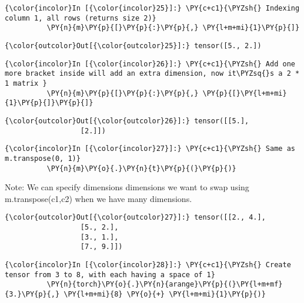 \begin{Verbatim}[commandchars=\\\{\}]
{\color{incolor}In [{\color{incolor}25}]:} \PY{c+c1}{\PYZsh{} Indexing column 1, all rows (returns size 2)}
          \PY{n}{m}\PY{p}{[}\PY{p}{:}\PY{p}{,} \PY{l+m+mi}{1}\PY{p}{]} 
\end{Verbatim}


\begin{Verbatim}[commandchars=\\\{\}]
{\color{outcolor}Out[{\color{outcolor}25}]:} tensor([5., 2.])
\end{Verbatim}
            
\begin{Verbatim}[commandchars=\\\{\}]
{\color{incolor}In [{\color{incolor}26}]:} \PY{c+c1}{\PYZsh{} Add one more bracket inside will add an extra dimension, now it\PYZsq{}s a 2 * 1 matrix }
          \PY{n}{m}\PY{p}{[}\PY{p}{:}\PY{p}{,} \PY{p}{[}\PY{l+m+mi}{1}\PY{p}{]}\PY{p}{]} 
\end{Verbatim}


\begin{Verbatim}[commandchars=\\\{\}]
{\color{outcolor}Out[{\color{outcolor}26}]:} tensor([[5.],
                  [2.]])
\end{Verbatim}

            
\begin{Verbatim}[commandchars=\\\{\}]
{\color{incolor}In [{\color{incolor}27}]:} \PY{c+c1}{\PYZsh{} Same as m.transpose(0, 1)}
          \PY{n}{m}\PY{o}{.}\PY{n}{t}\PY{p}{(}\PY{p}{)} 
\end{Verbatim}
Note: We can specify dimensions dimensions we want to swap using m.transpose(c1,c2) when we have many dimensions.

\begin{Verbatim}[commandchars=\\\{\}]
{\color{outcolor}Out[{\color{outcolor}27}]:} tensor([[2., 4.],
                  [5., 2.],
                  [3., 1.],
                  [7., 9.]])
\end{Verbatim}
            
\begin{Verbatim}[commandchars=\\\{\}]
{\color{incolor}In [{\color{incolor}28}]:} \PY{c+c1}{\PYZsh{} Create tensor from 3 to 8, with each having a space of 1}
          \PY{n}{torch}\PY{o}{.}\PY{n}{arange}\PY{p}{(}\PY{l+m+mf}{3.}\PY{p}{,} \PY{l+m+mi}{8} \PY{o}{+} \PY{l+m+mi}{1}\PY{p}{)} 
\end{Verbatim}


